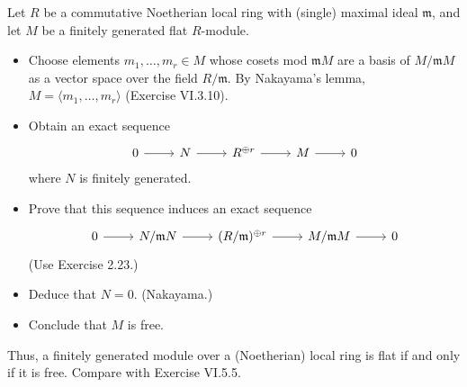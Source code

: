\documentclass[../../master.tex]{subfiles}
\begin{document}
\begin{problem}
    Let $R$ be a commutative Noetherian local ring with (single) maximal ideal $\mathfrak{m}$, and let $M$ be a finitely generated flat $R$-module.
    \begin{itemize}
        \item Choose elements $m_1, \ldots, m_r \in M$ whose cosets mod $\mathfrak{m}M$ are a basis of $M/\mathfrak{m}M$ as a vector space over the field $R/\mathfrak{m}$.
            By Nakayama's lemma, $M = \langle m_1, \ldots, m_r \rangle$ (Exercise VI.3.10).
        \item Obtain an exact sequence
            \[
            \begin{tikzcd}
                0 & N & R^{\oplus r} & M & 0
                \arrow[from=1-1, to=1-2]
                \arrow[from=1-2, to=1-3]
                \arrow[from=1-3, to=1-4]
                \arrow[from=1-4, to=1-5] 
            \end{tikzcd}
            \]
            where $N$ is finitely generated.
        \item Prove that this sequence induces an exact sequence
            \[
            \begin{tikzcd}
                0 & N/\mathfrak{m}N & (R/\mathfrak{m})^{\oplus r} & M/\mathfrak{m}M & 0
                \arrow[from=1-1, to=1-2]
                \arrow[from=1-2, to=1-3]
                \arrow[from=1-3, to=1-4]
                \arrow[from=1-4, to=1-5] 
            \end{tikzcd}
            \]
            (Use Exercise 2.23.)
        \item Deduce that $N = 0$. (Nakayama.)
        \item Conclude that $M$ is free.
    \end{itemize}
    Thus, a finitely generated module over a (Noetherian) local ring is flat if and only if it is free.
    Compare with Exercise VI.5.5.
\end{problem}
\end{document}
